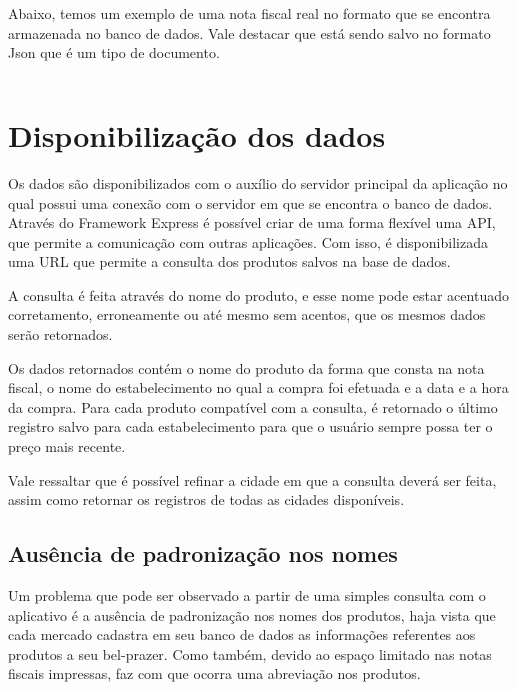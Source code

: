 Abaixo, temos um exemplo de uma nota fiscal real no formato que se encontra armazenada no banco de dados. Vale destacar que está sendo salvo no formato Json que é um tipo de documento.

\inputminted{octave}{exemplo-nfce.json}

\newpage
\section{Disponibilização dos dados}



Os dados são disponibilizados com o auxílio do servidor principal da aplicação no qual possui uma conexão com o servidor em que se encontra o banco de dados. Através do Framework Express é possível criar de uma forma flexível uma API, que permite a comunicação com outras aplicações. Com isso, é disponibilizada uma URL que permite a consulta dos produtos salvos na base de dados.

A consulta é feita através do nome do produto, e esse nome pode estar acentuado corretamento, erroneamente ou até mesmo sem acentos, que os mesmos dados serão retornados.

Os dados retornados contém o nome do produto da forma que consta na nota fiscal, o nome do estabelecimento no qual a compra foi efetuada e a data e a hora da compra. Para cada produto compatível com a consulta, é retornado o último registro salvo para cada estabelecimento para que o usuário sempre possa ter o preço mais recente.

Vale ressaltar que é possível refinar a cidade em que a consulta deverá ser feita, assim como retornar os registros de todas as cidades disponíveis.

\subsection{Ausência de padronização nos nomes}

Um problema que pode ser observado a partir de uma simples consulta com o aplicativo é a ausência de padronização nos nomes dos produtos, haja vista que cada mercado cadastra em seu banco de dados as informações referentes aos produtos a seu bel-prazer. Como também, devido ao espaço limitado nas notas fiscais impressas, faz com que ocorra uma abreviação nos produtos.

